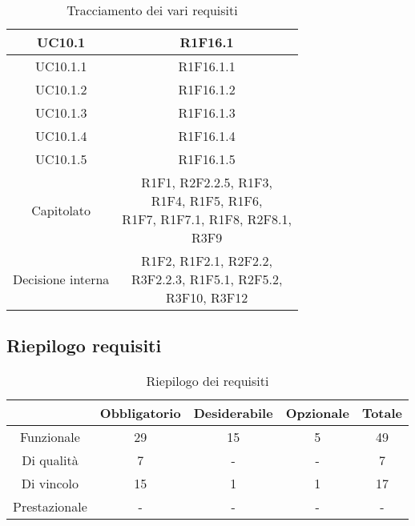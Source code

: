 \begin{table}[H]
\begin{tabular}{c | c}
		UC10.1                                                  & R1F16.1                          \\ \hline
		UC10.1.1                                                & R1F16.1.1                        \\ \hline
		UC10.1.2                                                & R1F16.1.2                        \\ \hline
		UC10.1.3                                                & R1F16.1.3                        \\ \hline
		UC10.1.4                                                & R1F16.1.4                        \\ \hline
		UC10.1.5                                                & R1F16.1.5                        \\ \hline
		Capitolato                                              & \Shortunderstack{R1F1, R2F2.2.5, R1F3,\\ R1F4, R1F5, R1F6, \\R1F7, R1F7.1, R1F8, R2F8.1, \\R3F9}  \\ \hline
		Decisione interna                                       & \Shortunderstack{R1F2,  R1F2.1, R2F2.2,\\ R3F2.2.3, R1F5.1, R2F5.2,\\ R3F10, R3F12\\} \\

	\end{tabular}
	\caption{Tracciamento dei vari requisiti}
\end{table}

\subsection{Riepilogo requisiti} \label{subsection: riepilogo}

\begin{table}[H]
	\centering
	\renewcommand{\arraystretch}{1.8}
	\begin{tabular}{c | c | c | c | c}
		\rowcolor[HTML]{125E28}
		\multicolumn{1}{c}{\color[HTML]{FFFFFF} \textbf{Tipologia}}    &
		\multicolumn{1}{c}{\color[HTML]{FFFFFF} \textbf{Obbligatorio}} &
		\multicolumn{1}{c}{\color[HTML]{FFFFFF} \textbf{Desiderabile}} &
		\multicolumn{1}{c}{\color[HTML]{FFFFFF} \textbf{Opzionale}}    &
		\multicolumn{1}{c}{\color[HTML]{FFFFFF} \textbf{Totale}}                          \\
		\hline
		Funzionale                                                     & 29 & 15 & 5 & 49 \\ \hline
		Di qualità                                                     & 7  & -  & - & 7  \\ \hline
		Di vincolo                                                     & 15 & 1  & 1 & 17 \\ \hline
		Prestazionale                                                  & -  & -  & - & -  \\
	\end{tabular}
	\caption{Riepilogo dei requisiti}
\end{table}